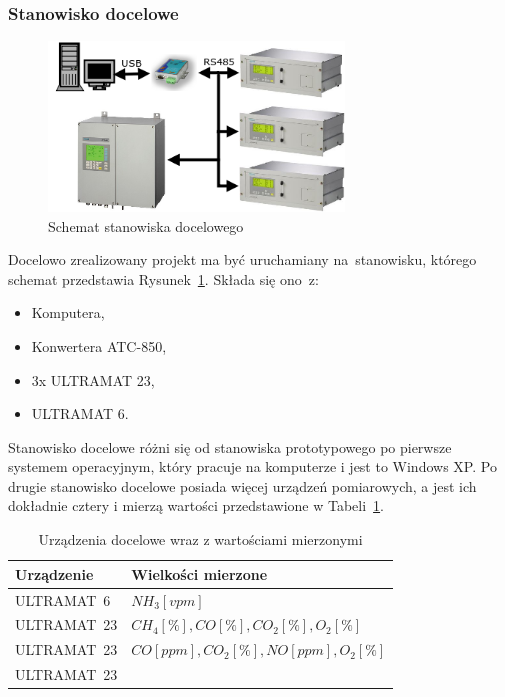 \subsubsection{Stanowisko docelowe}
\begin{figure}[!htb] 	\centering 	\includegraphics[width=0.7\textwidth]{images/schemat2} 	\caption{Schemat stanowiska docelowego} \label{schemat2} \end{figure} 
Docelowo zrealizowany projekt ma być uruchamiany na~stanowisku, którego schemat przedstawia Rysunek~\ref{schemat2}. Składa się ono~z:
\begin{itemize}
\item Komputera,
\item Konwertera ATC-850,
\item 3x ULTRAMAT 23,
\item ULTRAMAT 6.
\end{itemize}
\indent
\indent Stanowisko docelowe różni się od stanowiska prototypowego po pierwsze systemem operacyjnym, który pracuje na komputerze i jest to Windows XP. Po drugie stanowisko docelowe posiada więcej urządzeń pomiarowych, a jest ich dokładnie cztery i mierzą wartości przedstawione w Tabeli~\ref{tab:docelowe}.

\begin{table}[h]
\centering
\begin{tabular}{|l|l|}
\hline Urządzenie & Wielkości mierzone \\ 
\hline ULTRAMAT~6 & $ NH_3 [vpm] $ \\ 
\hline ULTRAMAT~23 & $ CH_4 [\%], CO [\%], CO_2 [\%], O_2 [\%] $ \\ 
\hline ULTRAMAT~23 & $ CO [ppm], CO_2 [\%], NO [ppm], O_2 [\%] $ \\ 
\hline ULTRAMAT~23 & $  $ \\ 
\hline 
\end{tabular} 
\caption{Urządzenia docelowe wraz z wartościami mierzonymi}
\label{tab:docelowe}
\end{table}

